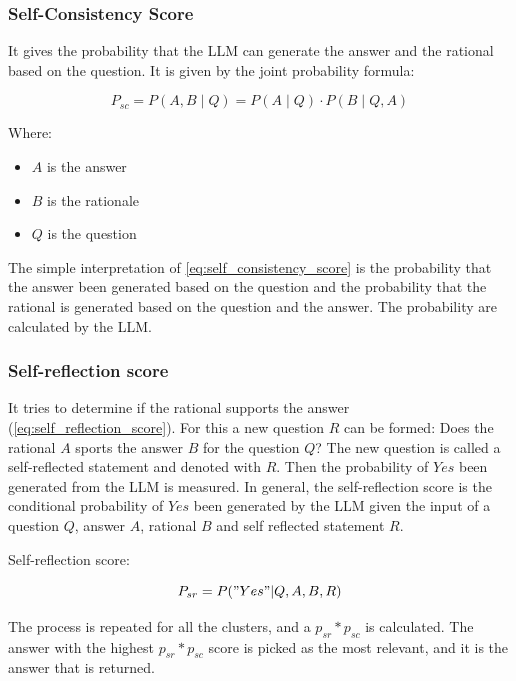 \documentclass{wseas}
\begin{document}
\subsubsection{Self-Consistency Score}

It gives the probability that the LLM can generate the answer and the
rational based on the question. It is given by the joint probability
formula:

\begin{equation}
  P_{sc} = P(A,B \mid Q) = P(A \mid Q) \cdot P(B \mid Q, A)
  \label{eq:self_consistency_score}
\end{equation}
  
Where:
\begin{itemize}
  \item \( A \) is the answer
  \item \( B \) is the rationale
  \item \( Q \) is the question
\end{itemize}

The simple interpretation of \autoref{eq:self_consistency_score} is the
probability that the answer been generated based on the question and the
probability that the rational is generated based on the question and the
answer. The probability are calculated by the LLM. 

\subsubsection{Self-reflection score}

It tries to determine if the rational supports the answer (\autoref{eq:self_reflection_score}). For this a new
question $R$ can be formed: Does the rational $A$ sports the answer
$B$ for the question $Q$? The new question is called a
self-reflected statement and denoted with $R$. Then the probability of $Yes$
been generated from the LLM is measured. In general, the self-reflection
score is the conditional probability of $Yes$ been generated by the
LLM given the input of a question $Q$, answer $A$, rational $B$ and self
reflected statement $R$.

Self-reflection score: 

\begin{equation}
  P_{sr} = P("Yes"|Q, A, B, R)
  \label{eq:self_reflection_score}  
\end{equation}

The process is repeated for all the clusters, and a \(p_{sr}*p_{sc}\) is
calculated. The answer with the highest \(p_{sr}*p_{sc}\) score is
picked as the most relevant, and it is the answer that is returned.
\end{document}
